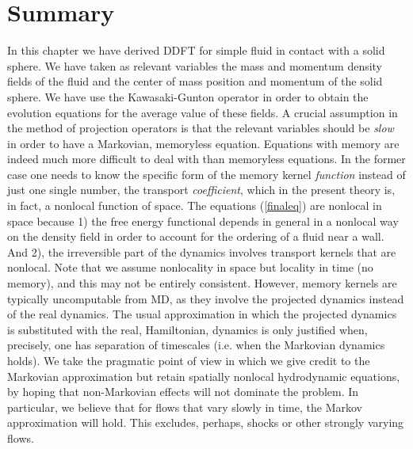 \documentclass[b5paper,openright,10pt]{book}
\begin{document}
\section{Summary}
In this chapter we have derived DDFT for simple fluid in contact with a solid sphere. We have taken as relevant variables the mass and momentum density fields of the fluid and the center of mass position and momentum of the solid sphere. We have use the Kawasaki-Gunton operator in order to obtain the evolution equations for the average value of these fields.  
A crucial assumption in the method of projection operators is that the
relevant variables should be {\em slow}  in order to have a Markovian,
memoryless  equation.   Equations with  memory  are  indeed much  more
difficult to deal with than  memoryless equations.  In the former case
one  needs  to know  the  specific  form  of  the memory  kernel  {\em
  function}  instead of  just one  single number,  the transport  {\em
  coefficient}, which in  the present theory is, in  fact, a nonlocal
function  of space.   The equations  (\ref{finaleq}) are  nonlocal in
space because  1) the free energy  functional depends in general  in a
nonlocal  way on  the  density  field in  order  to  account for  the
ordering of a fluid near a wall.  And 2), the irreversible part of the
dynamics involves transport kernels that  are nonlocal.  Note that we
assume nonlocality  in space  but locality in  time (no  memory), and
this  may not  be entirely  consistent.  However,  memory kernels  are
typically uncomputable from MD, as they involve the projected dynamics
instead of  the real  dynamics. The usual  approximation in  which the
projected dynamics is substituted with the real, Hamiltonian, dynamics
is only justified  when, precisely, one has separation  of timescales
(i.e.   when the  Markovian dynamics  holds).  We  take the  pragmatic
point of view  in which we give credit to  the Markovian approximation
but retain spatially nonlocal  hydrodynamic equations, by hoping that
non-Markovian effects will not dominate the problem. In particular, we
believe  that  for  flows  that   vary  slowly  in  time,  the  Markov
approximation  will hold.   This  excludes, perhaps,  shocks or  other
strongly varying flows.
\end{document}
